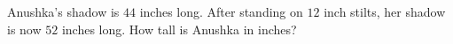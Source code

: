 Anushka's shadow is $44$ inches long. After standing on $12$ inch stilts, her shadow is now $52$ inches long. How tall is Anushka in inches?
